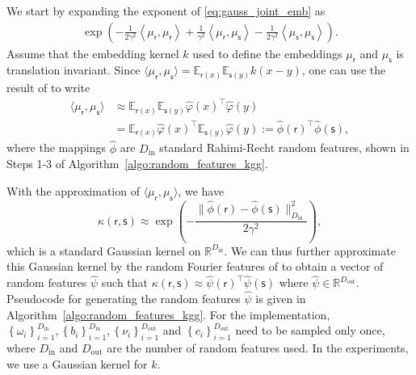 \documentclass[english]{article}
\theoremstyle{plain}
\theoremstyle{plain}
\begin{document}
We start by expanding the  exponent 
of \eqref{eq:gauss_joint_emb} as
%
\begin{align*}
  \exp\left(-\frac{1}{2\gamma^{2}}\left\langle \mu_{\mathsf{r}},\mu_{\mathsf{r}}\right\rangle +\frac{1}{\gamma^{2}}\left\langle \mu_{\mathsf{r}},\mu_{\mathsf{s}}\right\rangle -\frac{1}{2\gamma^{2}}\left\langle \mu_{\mathsf{s}},\mu_{\mathsf{s}}\right\rangle \right).
\end{align*}
%
Assume that the embedding kernel $k$ used to define the embeddings $\mu_\mathsf{r}$ 
and $\mu_\mathsf{s}$ is translation invariant. Since 
$\langle \mu_{\mathsf{r}},\mu_{\mathsf{s}}  \rangle
= \mathbb{E}_{\mathsf{r}(x)} \mathbb{E}_{\mathsf{s}(y)} k(x-y)$, one can use 
the result of \cite{Rahimi2007} to write
%
\begin{align*}
 \langle \mu_{\mathsf{r}},\mu_{\mathsf{s}}  \rangle
 & \approx \mathbb{E}_{\mathsf{r}(x)} \mathbb{E}_{\mathsf{s}(y)} 
   \hat{\varphi}(x)^\top \hat{\varphi}(y) \nonumber \\ 
 & = \mathbb{E}_{\mathsf{r}(x)} 
   \hat{\varphi}(x)^\top \mathbb{E}_{\mathsf{s}(y)}  \hat{\varphi}(y) 
 := \hat{\phi}(\mathsf{r})^\top \hat{\phi}(\mathsf{s}),
\end{align*}
%
where the mappings $\hat{\phi}$ are $D_\mathrm{in}$ standard Rahimi-Recht
random features, shown in Steps 1-3 of
Algorithm~\ref{algo:random_features_kgg}.



With the approximation of $\langle \mu_{\mathsf{r}},\mu_{\mathsf{s}}  \rangle$,
we have
\begin{equation}
\kappa(\mathsf{r}, \mathsf{s})\approx\exp\left(-\frac{\|\hat{\phi}(\mathsf{r})-\hat{\phi}(\mathsf{s})\|_{D_\mathrm{in}}^{2}}{2\gamma^{2}}\right),
%
\end{equation}
which is a standard Gaussian kernel on $\mathbb{R}^{D_\mathrm{in}}$.
We can thus further approximate this Gaussian kernel 
%
%
by the random Fourier features of \citeauthor{Rahimi2007} to obtain a vector 
of random features $\hat{\psi}$ such that 
$\kappa(\mathsf{r}, \mathsf{s}) \approx \hat{\psi}(\mathsf{r})^\top \hat{\psi}(\mathsf{s})$
where $\hat{\psi} \in \mathbb{R}^{D_\mathrm{out}}$. 
Pseudocode for generating the random features $\hat{\psi}$ is given in Algorithm~\ref{algo:random_features_kgg}. 
For the implementation, $\left\{ \omega_{i}\right\}
_{i=1}^{D_\mathrm{in}},\left\{ b_{i}\right\} _{i=1}^{D_\mathrm{in}},\left\{
    \nu_{i}\right\} _{i=1}^{D_\mathrm{out}}$ 
and $\left\{ c_{i}\right\} _{i=1}^{D_\mathrm{out}}$ need to be sampled only
once, where $D_\mathrm{in}$ and
$D_\mathrm{out}$ are the number of random features used. 
In the experiments, we use a Gaussian kernel for $k$.
\end{document}
